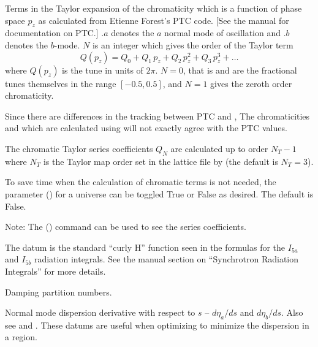 \begin{description}
{{{{{  %
  \item[chrom_ptc.a.$N$, chrom_ptc.b.$N$, $N = 0, 1, 2, \ldots$] \Newline {}
Terms in the Taylor expansion of the chromaticity which is a function of phase space $p_z$ as
calculated from Etienne Forest's PTC code. [See the \bmad manual for documentation on PTC.] $.a$
denotes the $a$ normal mode of oscillation and $.b$ denotes the $b$-mode. $N$ is an integer which
gives the order of the Taylor term
\begin{equation}
  Q(p_z) = Q_0 + Q_1 \, p_z + Q_2 \, p_z^2 + Q_3 \, p_z^3 + \ldots
\end{equation}
where $Q(p_z)$ is the tune in units of $2\pi$.  $N = 0$, that is  and
 are the fractional tunes themselves in the range $[-0.5, 0.5]$, and $N = 1$ gives
the zeroth order chromaticity.

Since there are differences in the tracking between PTC and \bmad, The chromaticities  and
 which are calculated using \bmad will not exactly agree with the PTC values.

The chromatic Taylor series coefficients $Q_N$ are calculated up to order $N_T-1$ where $N_T$ is the
Taylor map order set in the lattice file by  (the default is $N_T=3$). 

To save time when the calculation of chromatic terms is not needed, the  parameter
() for a universe can be toggled True or False as desired. The default is False.

Note: The  () command can be used to see the series coefficients.

  \item[curly_h.a, .b] \Newline {}
The  datum is the standard ``curly H'' function seen in the formulas for the $I_{5a}$
and $I_{5b}$ radiation integrals. See the \bmad manual section on ``Synchrotron Radiation Integrals''
for more details.

  \item[damp.j_a, .j_b, .j_z] \Newline {}
Damping partition numbers.

  \item[deta_ds.a, deta_ds.b] \Newline {}
Normal mode dispersion derivative with respect to $s$ -- $d\eta_a/ds$ and $d\eta_b/ds$.
Also see  and . These datums are useful when optimizing to minimize
the dispersion in a region.

}}}}}
\end{description}
